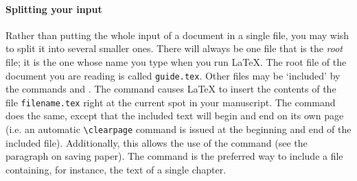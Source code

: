 \paragraph*{Splitting your input}
Rather than putting the whole input of a document in a single file, you
may wish to split it into several smaller ones.
There will always be one file that is the {\em root} file; it is the one
whose name you type when you run \LaTeX{}.
The root file of the document you are reading is called \verb|guide.tex|.
Other files may be `included' by the commands \verb|| and \verb||.
The command \verb|| causes \LaTeX{} to insert the contents
of the file \verb|filename.tex| right at the current spot in your manuscript.
The command \verb|| does the same, except that the
included text will begin and end on its own page (i.e. an automatic
\verb|\clearpage| command is issued at the beginning and end of the included
file).
Additionally, this allows the use of the \verb|| command
(see the paragraph on saving paper).
The \verb|| command is the preferred way to include a file containing,
for instance, the text of a single chapter.

